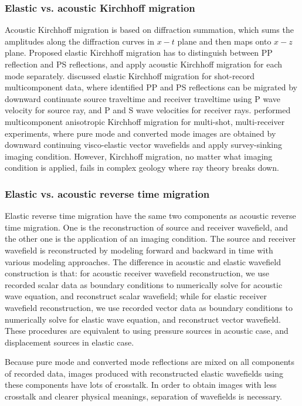 \subsubsection{Elastic vs. acoustic Kirchhoff migration}
Acoustic Kirchhoff migration is based on diffraction summation, which sums the amplitudes along the diffraction curves in $x-t$ plane and then maps onto $x-z$ plane. Proposed elastic Kirchhoff migration has to distinguish between PP reflection and PS reflections, and apply acoustic Kirchhoff migration for each mode separately.
\cite{GEO49-08-12231238} discussed elastic Kirchhoff migration for shot-record multicomponent data, where identified PP and PS reflections can be migrated by downward continuate source traveltime and receiver traveltime using P wave velocity for source ray, and P and S wave velocities for receiver rays. 
\cite{hokstad:861} performed multicomponent anisotropic Kirchhoff migration for multi-shot, multi-receiver experiments, where pure mode and converted mode images are obtained by downward continuing visco-elastic vector wavefields and apply survey-sinking imaging condition. 
However, Kirchhoff migration, no matter what imaging condition is applied, fails in complex geology where ray theory breaks down.

\subsubsection{Elastic vs. acoustic reverse time migration}
Elastic reverse time migration have the same two components as acoustic reverse time migration. One is the reconstruction of source and receiver wavefield, and the other one is the application of an imaging condition. 
The source and receiver wavefield is reconstructed by modeling forward and backward in time with various modeling approaches. The difference in acoustic and elastic wavefield construction is that: for acoustic receiver wavefield reconstruction, we use recorded scalar data as boundary conditions to numerically solve for acoustic wave equation, and reconstruct scalar wavefield; while for elastic receiver wavefield reconstruction, we use recorded vector data as boundary conditions to numerically solve for elastic wave equation, and reconstruct vector wavefield.
These procedures are equivalent to using pressure sources in acoustic case, and displacement sources in elastic case.


Because pure mode and converted mode reflections are mixed on all components of recorded data, images produced with reconstructed elastic wavefields using these components have lots of crosstalk. In order to obtain images with less crosstalk and clearer physical meanings, separation of wavefields is necessary.

